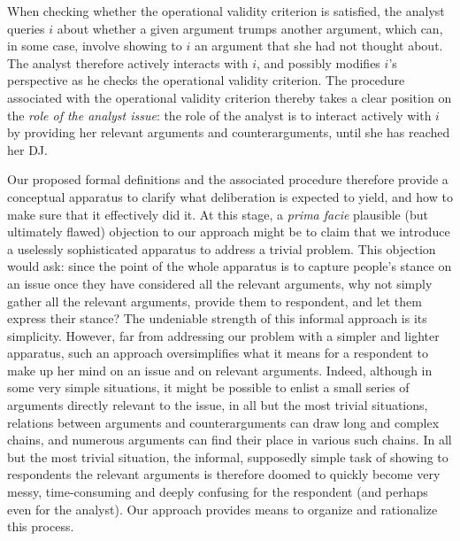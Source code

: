 \documentclass[version=3.21, pagesize, twoside=off, bibliography=totoc, DIV=calc, fontsize=12pt, a4paper, french, english]{scrartcl}
\begin{document}
{When checking whether the operational validity criterion is satisfied, the analyst queries $i$ about whether a given argument trumps another argument, which can, in some case, involve showing to $i$ an argument that she had not thought about. The analyst therefore actively interacts with $i$, and possibly modifies $i$’s perspective as he checks the operational validity criterion. 
The procedure associated with the operational validity criterion thereby takes a clear position on the \emph{role of the analyst issue}: the role of the analyst is to interact actively with $i$ by providing her relevant arguments and counterarguments, until she has reached her \ac{DJ}.

Our proposed formal definitions and the associated procedure therefore provide a conceptual apparatus to clarify what deliberation is expected to yield, and how to make sure that it effectively did it. At this stage, a \emph{prima facie} plausible (but ultimately flawed) objection to our approach might be to claim that we introduce a uselessly sophisticated apparatus to address a trivial problem. This objection would ask: since the point of the whole apparatus is to capture people's stance on an issue once they have considered all the relevant arguments, why not simply gather all the relevant arguments, provide them to respondent, and let them express their stance? The undeniable strength of this informal approach is its simplicity. However, far from addressing our problem with a simpler and lighter apparatus, such an approach oversimplifies what it means for a respondent to make up her mind on an issue and on relevant arguments. Indeed, although in some very simple situations, it might be possible to enlist a small series of arguments directly relevant to the issue, in all but the most trivial situations, relations between arguments and counterarguments can draw long and complex chains, and numerous arguments can find their place in various such chains. In all but the most trivial situation, the informal, supposedly simple task of showing to respondents the relevant arguments is therefore doomed to quickly become very messy, time-consuming and deeply confusing for the respondent (and perhaps even for the analyst). Our approach provides means to organize and rationalize this process.
}
\end{document}
